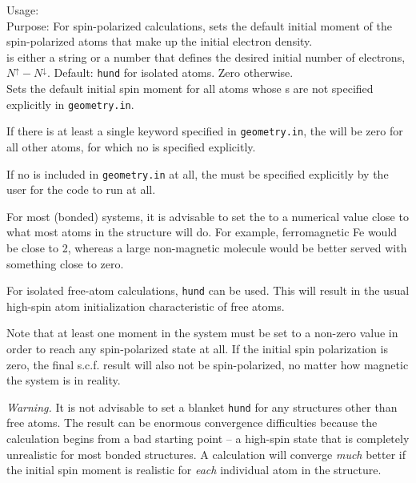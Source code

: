 {
  \noindent
  Usage:   \\[1.0ex]
  Purpose: For spin-polarized calculations, sets the default initial
    moment of the spin-polarized atoms that make up the initial
    electron density. \\[1.0ex]
   is either a string or a number that defines the
    desired initial number of electrons, $N^\uparrow -
    N^\downarrow$. Default: \texttt{hund} for isolated atoms. Zero
    otherwise. \\ 
}
Sets the default initial spin moment for all atoms whose
s are not specified explicitly in
\texttt{geometry.in}. 

If there is at least a single  keyword specified in
\texttt{geometry.in}, the  will be zero for
all other atoms, for which no  is specified
explicitly. 

If no  is included in \texttt{geometry.in} at all, the  
 must be specified explicitly by the user
for the code to run at all.

For most (bonded) systems, it is advisable to set the
 to a numerical value close to what most
atoms in the structure will do. For example, ferromagnetic Fe would be close to
2, whereas a large non-magnetic molecule would be better served with something
close to zero.

For isolated free-atom calculations, 
\texttt{hund} can be used. This will result in the usual high-spin atom
initialization characteristic of free atoms.

Note that at least one moment in the system must be set to a non-zero value in
order to reach any spin-polarized state at all. If the initial spin
polarization is zero, the final s.c.f. result will also not be spin-polarized,
no matter how magnetic the system is in reality.

\emph{Warning.} It is not advisable to set a blanket
 \texttt{hund} for any structures
other than free atoms. The result can be enormous convergence
difficulties because the calculation begins from a bad starting point
-- a high-spin state that is completely unrealistic for most bonded
structures. A calculation will converge \emph{much} better if the
initial spin moment is realistic for \emph{each} individual atom in
the structure.

